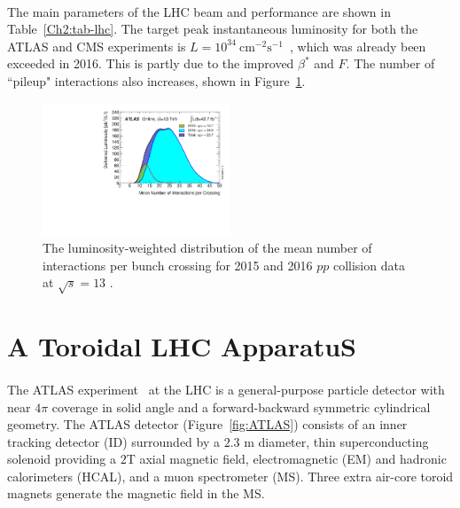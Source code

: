 \paragraph{}
The main parameters of the LHC beam and performance are shown in Table~\ref{Ch2:tab-lhc}. 
The target peak instantaneous luminosity for both the ATLAS and CMS experiments is $L=10^{34}~\text{cm}^{-2}\text{s}^{-1}$~\cite{LHCPaper}, which was already been exceeded in 2016. 
This is partly due to the improved $\beta^*$ and $F$.
The number of ``pileup" interactions also increases, shown in Figure~\ref{fig:Mu_2015_2016}. 

\begin{figure}[htbp!]
  \centering
  \captionsetup{justification=centering}
  \includegraphics[width=0.5\textwidth,angle=-90]{figures/detector/Mu_2015_2016}
   \caption{The luminosity-weighted distribution of the mean number of interactions per bunch crossing for 2015 and 2016 $pp$ collision data at $\sqrt{s} = 13$ \TeV.~\cite{Lumi_Run2}}
  \label{fig:Mu_2015_2016}
\end{figure}


\section{A Toroidal LHC ApparatuS}
\label{sec:ATLAS}

\paragraph{}
The ATLAS experiment~\cite{PERF-2007-01} at the LHC is a general-purpose particle detector with near $4\pi$ coverage in solid angle and a forward-backward symmetric cylindrical geometry. 
The ATLAS detector (Figure~\ref{fig:ATLAS}) consists of an inner tracking detector (ID) surrounded by a $2.3$ m diameter, thin superconducting solenoid providing a $2$T axial magnetic field, electromagnetic (EM) and hadronic calorimeters (HCAL), and a muon spectrometer (MS). Three extra air-core toroid magnets generate the magnetic field in the MS. 

